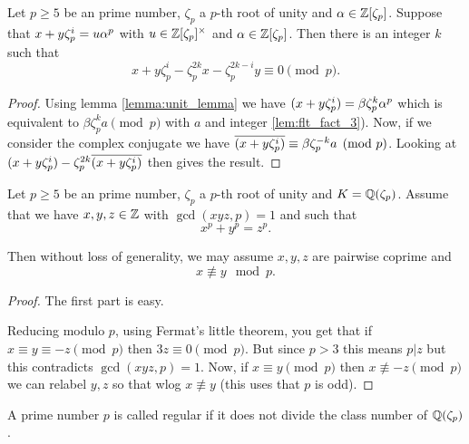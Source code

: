 \begin{lemma}\label{lem:flt_fact_5}
	Let $p \geq 5$ be an prime number, $\zeta_p$ a $p$-th root of unity and $ \alpha \in \mathbb{Z}[\zeta_p]$.  Suppose that $x+y\zeta_p^i=u \alpha^p$ with $u \in \mathbb{Z}[\zeta_p]^\times$ and $\alpha \in \mathbb{Z}[\zeta_p]$. Then there is an integer $k$ such that \[x+y\zeta_p^i-\zeta_p^{2k}x-\zeta_p^{2k-i}y \equiv 0 \pmod p.\]
\end{lemma}

\begin{proof}
 Using lemma \ref{lemma:unit_lemma} we have $(x+y\zeta_p^i) =\beta \zeta_p^k \alpha^p$ which is equivalent to $\beta \zeta_p^k a \pmod p$ with $a$ and integer \ref{lem:flt_fact_3}). Now, if we consider the complex conjugate we have $\overline{(x+y\zeta_p^i)  }\equiv \beta \zeta_p^{-k}a \pmod p$. Looking at $(x+y\zeta_p^i)-\zeta_p^{2k}\overline{(x+y\zeta_p^i)  }$ then gives the result.


\end{proof}


\begin{lemma}\label{lemma:may_assume}

	Let $p \geq 5$ be an prime number, $\zeta_p$ a $p$-th root of unity and $K=\mathbb{Q}(\zeta_p)$.  Assume that we have $x,y,z \in \mathbb{Z}$ with $\gcd(xyz,p)=1$ and such that \[x^p+y^p=z^p.\]

Then without loss of generality, we may assume $x,y,z$ are pairwise coprime and \[x \not \equiv y \mod p.\]
\end{lemma}



\begin{proof}
The first part is easy.

Reducing modulo $p$, using Fermat's little theorem, you get that if $x \equiv y \equiv -z \pmod p$ then $3z \equiv 0 \pmod p$. But since $p >3$ this means $p |z$ but this contradicts $\gcd(xyz,p)=1$. Now, if $x \equiv y \pmod p$ then  $x \not \equiv -z \pmod p$ we can relabel $y,z$ so that wlog $x \not \equiv y$ (this uses that $p$ is odd).

\end{proof}

\begin{definition}\label{defn:is_regular_number}
	\leanok
	A prime number $p$ is called regular if it does not divide the class number of $\mathbb{Q}(\zeta_p)$.
\end{definition}



